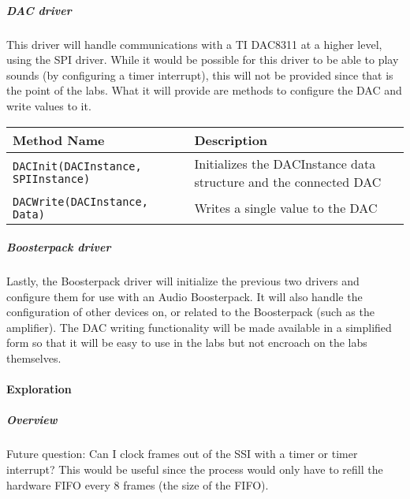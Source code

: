 \documentclass{article}
\begin{document}
\subparagraph{DAC driver}
This driver will handle communications with a TI DAC8311 at a higher level, using the SPI driver. While it would be 
possible for this driver to be able to play sounds (by configuring a timer interrupt), this will not be provided since that is 
the point of the labs. What it will provide are methods to configure the DAC and write values to it. \\

\begin{tabularx}{\linewidth}{| X | X |}
    \hline
    Method Name & Description \\
    \hline
    \texttt{DACInit(DACInstance, SPIInstance)} & Initializes the DACInstance data structure and the connected DAC \\
    \texttt{DACWrite(DACInstance, Data)} & Writes a single value to the DAC \\
    \hline
\end{tabularx}

\subparagraph{Boosterpack driver}
Lastly, the Boosterpack driver will initialize the previous two drivers and configure them for use with an Audio Boosterpack. It 
will also handle the configuration of other devices on, or related to the Boosterpack (such as the amplifier). The DAC writing 
functionality will be made available in a simplified form so that it will be easy to use in the labs but not encroach on the labs
 themselves.

\paragraph{Exploration}
\subparagraph{Overview}
Future question: Can I clock frames out of the SSI with a timer or timer interrupt? This would be useful since the process would 
only have to refill the hardware FIFO every 8 frames (the size of the FIFO).
\end{document}
